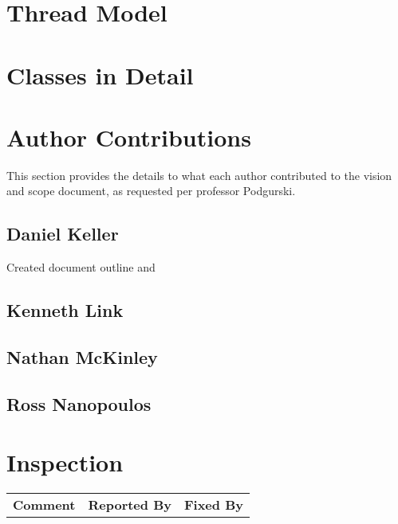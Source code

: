 \documentclass[letter]{scrartcl}
\begin{document}
\section{Thread Model}

\section{Classes in Detail}

\pagebreak
\section{Author Contributions}
This section provides the details to what each author contributed to the vision and scope document, as requested per professor Podgurski.
\subsection{Daniel Keller}
Created document outline and 
\subsection{Kenneth Link}

\subsection{Nathan McKinley}

\subsection{Ross Nanopoulos}


\section{Inspection}
\begin{tabularx}{\textwidth}{X c c}
\textbf{Comment} & \textbf{Reported By} & \textbf{Fixed By} \\
\end{tabularx}
\end{document}
